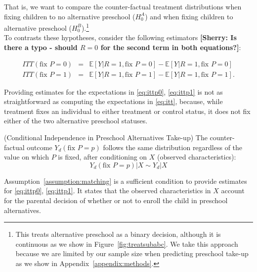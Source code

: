 \noindent That is, we want to compare the counter-factual treatment distributions when fixing children to no alternative preschool ($H_{0}^A$) and when fixing children to alternative preschool ($H_{0}^B$).\footnote{This treats alternative preschool as a binary decision, although it is continuous as we show in Figure~\ref{fig:treatsubabc}. We take this approach because we are limited by our sample size when predicting preschool take-up as we show in Appendix~\ref{appendix:methods}.}\\

\noindent To contrasts these hypotheses, consider the following estimators \textbf{[Sherry: Is there a typo - should $R=0$ for the second term in both equations?]}: 

\begin{eqnarray}
ITT \left( \text{fix } P = 0 \right) &=& \mathbb{E} \left[ Y | R = 1, \text{fix } P = 0 \right] - \mathbb{E} \left[ Y | R = 1, \text{fix } P = 0 \right] \label{eq:ittp0} \\
ITT \left( \text{fix } P = 1 \right) &=& \mathbb{E} \left[ Y | R = 1, \text{fix } P = 1 \right] - \mathbb{E} \left[ Y | R = 1, \text{fix } P = 1 \right]. \label{eq:ittp1}  
\end{eqnarray}

\noindent Providing estimates for the expectations in \eqref{eq:ittp0}, \eqref{eq:ittp1} is not as straightforward as computing the expectations in \eqref{eq:itt}, because, while treatment fixes an individual to either treatment or control status, it does not fix either of the two alternative preschool statuses.\\

\begin{assumption} \normalfont (Conditional Independence in Preschool Alternatives Take-up) The counter-factual outcome $Y_{d} \left( \text{fix } P=p \right)$ follows the same distribution regardless of the value on which $P$ is fixed, after conditioning on $X$ (observed characteristics): 
\begin{equation}
Y_{d} \left( \text{fix } P=p \right) | X \sim Y_{d}  | X 
\end{equation}
 \end{assumption}

\noindent Assumption~\ref{assumption:matching} is a sufficient condition to provide estimates for \eqref{eq:ittp0}, \eqref{eq:ittp1}.  It states that the observed characteristics in $X$ account for the parental decision of whether or not to enroll the child in preschool alternatives.\\

